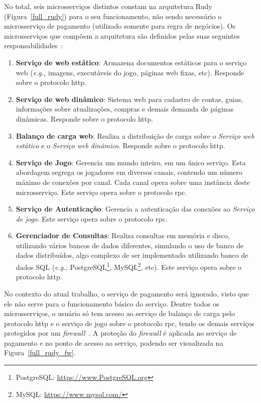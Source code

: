 No total, seis microsserviços distintos constam na arquitetura Rudy (Figura~\ref{full_rudy}) para o seu funcionamento, não sendo necessário o microsserviço de pagamento (utilizado somente para regra de negócios).
%
Os microsserviços que compõem a arquitetura são definidos pelas suas seguintes responsabilidades~\cite{matthiasrudy2011}:

\begin{enumerate}
  \item \textbf{Serviço de web estático}: Armazena documentos estáticos para o serviço web (\textit{e.g., }imagens, executáveis do jogo, páginas web fixas, etc). Responde sobre o protocolo \ac{http}.
  \item \textbf{Serviço de web dinâmico}: Sistema web para cadastro de contas, guias, informações sobre atualizações, compras e demais demanda de páginas dinâmicas. Responde sobre o protocolo \ac{http}.
  \item \textbf{Balanço de carga web}: Realiza a distribuição de carga sobre o \textit{Serviço web estático} e o \textit{Serviço web dinâmico}. Responde sobre o protocolo \ac{http}.
  \item \textbf{Serviço de Jogo}: Gerencia um mundo inteiro, em um único serviço. Esta abordagem segrega os jogadores em diversos canais, contendo um número máximo de conexões por canal. Cada canal opera sobre uma instância deste microsserviço. Este serviço opera sobre o protocolo \ac{rpc}.
  \item \textbf{Serviço de Autenticação}: Gerencia a autenticação das conexões ao \textit{Serviço de jogo}. Este serviço opera sobre o protocolo \ac{rpc}.
  \item \textbf{Gerenciador de Consultas}: Realiza consultas em memória e disco, utilizando vários bancos de dados diferentes, simulando o uso de banco de dados distribuídos, algo complexo de ser implementado utilizando banco de dados SQL (\textit{e.g.,} PostgreSQL\footnote{PostgreSQL: \url{https://www.PostgreSQL.org}}, MySQL\footnote{MySQL: \url{https://www.mysql.com/}}, etc). Este serviço opera sobre o protocolo \ac{http}.
\end{enumerate}


No contexto do atual trabalho, o serviço de pagamento será ignorado, visto que ele não serve para o funcionamento básico do serviço.
%
Dentre todos os microsserviços, o usuário só tem acesso ao serviço de balanço de carga pelo protocolo \ac{http} e o serviço de jogo sobre o protocolo \ac{rpc}, tendo os demais serviços protegidos por um \textit{firewall}~\cite{matthiasrudy2011}.
%
A proteção do \textit{firewall} é aplicada no serviço de pagamento e no ponto de acesso ao serviço, podendo ser visualizada na Figura~\ref{full_rudy_fw}.


